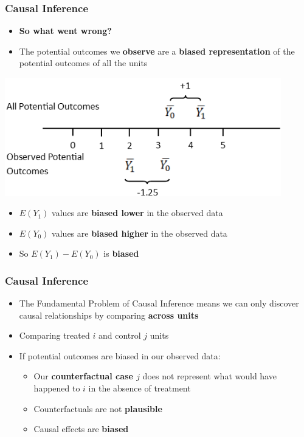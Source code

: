 \documentclass[xcolor=x11names,compress]{beamer}\usepackage[]{graphicx}\usepackage[]{color}
\renewcommand{\(}{\begin{columns}}
\renewcommand{\)}{\end{columns}}
\newcommand{\<}[1]{\begin{column}{#1}}
\renewcommand{\>}{\end{column}}
\begin{document}
\begin{frame}
\frametitle{Causal Inference}
\begin{itemize}
\item \textbf{So what went wrong?}
\item The potential outcomes we \textbf{observe} are a \textbf{biased representation} of the potential outcomes of all the units
\end{itemize}
\includegraphics[width=0.9\textwidth]{figure/PO_number_line_2.png}
\begin{itemize}
\item $E(Y_1)$ values are \textbf{biased lower} in the observed data
\pause
\item $E(Y_0)$ values are \textbf{biased higher} in the observed data
\pause
\item So $E(Y_1)-E(Y_0)$ is \textbf{biased}
\end{itemize}
\end{frame}

\begin{frame}
\frametitle{Causal Inference}
\begin{itemize}
\item The Fundamental Problem of Causal Inference means we can only discover causal relationships by comparing \textbf{across units}
\pause
\item Comparing treated $i$ and control $j$ units
\pause
\item If potential outcomes are biased in our observed data:
\pause
\begin{itemize}
\item Our \textbf{counterfactual case $j$} does not represent what would have happened to $i$ in the absence of treatment
\pause
\item Counterfactuals are not \textbf{plausible}
\pause
\item Causal effects are \textbf{biased}
\end{itemize}
\end{itemize}
\end{frame}
\end{document}

